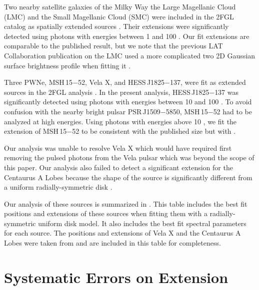 Two nearby satellite galaxies of the Milky Way the Large Magellanic Cloud (LMC)
and the Small Magellanic
Cloud (SMC) were included in the 2FGL catalog as spatially extended sources \citep{abdo_2010a_observations-large,abdo_2010a_detection-small}.  
Their extensions were significantly
detected using photons with energies between
1 \gev and 100 \gev. Our
fit extensions are comparable to the published result, but we note that
the previous LAT Collaboration publication on the LMC used a more complicated two 2D Gaussian surface
brightness profile when fitting it \citep{abdo_2010a_observations-large}.

Three PWNe, MSH\,15$-$52, Vela X, and HESS\,J1825$-$137, were fit as
extended sources in the 2FGL analysis \citep{abdo_2010a_detection-energetic,abdo_2010c_fermi-large,grondin_2011a_detection-pulsar}.  
In the present analysis, HESS\,J1825$-$137
was significantly detected using photons with energies between 10
\gev and 100 \gev.  To avoid confusion with the nearby bright pulsar
PSR\,J1509$-$5850, MSH\,15$-$52 had to be analyzed at high energies.
Using photons with energies above 10 \gev, we fit the extension of
MSH\,15$-$52 to be consistent with the published size but with .

Our analysis was unable to resolve Vela X which would have required first
removing the pulsed photons from the Vela pulsar which was beyond the
scope of this paper.  Our analysis also failed to detect a significant
extension for the Centaurus A Lobes because
the shape of the source is significantly different from a uniform
radially-symmetric disk \citep{abdo_2010a_fermi-gamma-ray}.



Our analysis of these sources is summarized in
.  This table includes the best fit
positions and extensions of these sources when fitting them 
with a radially-symmetric uniform disk model. It also
includes the best fit spectral parameters for each source.  The positions
and extensions of Vela X and the Centaurus A Lobes were taken from
\cite{abdo_2010c_fermi-large,abdo_2010a_fermi-gamma-ray} and are included in this table for completeness.

\section{Systematic Errors on Extension}

